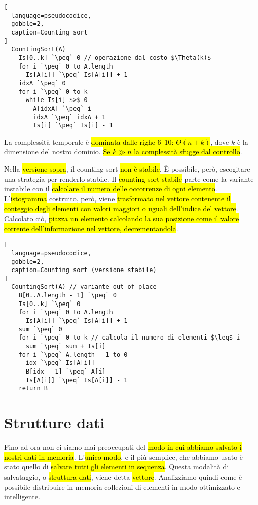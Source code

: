 \documentclass[a4paper,11pt,twoside]{article}
\theoremstyle{plain}
\theoremstyle{definition}
\theoremstyle{remark}
\newcommand{\peq}{$\gets$}
\begin{document}
\begin{lstlisting}[
  language=pseudocodice,
  gobble=2,
  caption=Counting sort
]
  CountingSort(A)
    Is[0..k] `\peq` 0 // operazione dal costo $\Theta(k)$
    for i `\peq` 0 to A.length
      Is[A[i]] `\peq` Is[A[i]] + 1
    idxA `\peq` 0
    for i `\peq` 0 to k
      while Is[i] $>$ 0
        A[idxA] `\peq` i
        idxA `\peq` idxA + 1
        Is[i] `\peq` Is[i] - 1
\end{lstlisting}

La complessità temporale è \hl{dominata dalle righe 6--10: $\Theta(n + k)$},
dove $k$ è la dimensione del nostro dominio. \hl{Se $k \gg n$ la complessità
sfugge dal controllo}.

Nella \hl{versione sopra}, il counting sort \hl{non è stabile}. È possibile,
però, escogitare una strategia per renderlo stabile. Il \hl{counting sort
stabile} parte come la variante instabile con il \hl{calcolare il numero delle
occorrenze di ogni elemento}. L'\hl{istogramma} costruito, però, viene
\hl{trasformato nel vettore contenente il conteggio degli elementi con valori
maggiori o uguali dell'indice del vettore}. Calcolato ciò, \hl{piazza un
elemento calcolando la sua posizione come il valore corrente dell'informazione
nel vettore, decrementandola}.

\begin{lstlisting}[
  language=pseudocodice,
  gobble=2,
  caption=Counting sort (versione stabile)
]
  CountingSort(A) // variante out-of-place
    B[0..A.length - 1] `\peq` 0
    Is[0..k] `\peq` 0
    for i `\peq` 0 to A.length
      Is[A[i]] `\peq` Is[A[i]] + 1
    sum `\peq` 0
    for i `\peq` 0 to k // calcola il numero di elementi $\leq$ i
      sum `\peq` sum + Is[i]
    for i `\peq` A.length - 1 to 0
      idx `\peq` Is[A[i]]
      B[idx - 1] `\peq` A[i]
      Is[A[i]] `\peq` Is[A[i]] - 1
    return B
\end{lstlisting}

\section{Strutture dati}\label{sec:strutture-dati}

Fino ad ora non ci siamo mai preoccupati del \hl{modo in cui abbiamo salvato i
nostri dati in memoria}. L'\hl{unico modo}, e il più semplice, che abbiamo usato
è stato quello di \hl{salvare tutti gli elementi in sequenza}. Questa modalità
di salvataggio, o \hl{struttura dati}, viene detta \hl{vettore}. Analizziamo
quindi come è possibile distribuire in memoria collezioni di elementi in modo
ottimizzato e intelligente.
\end{document}
